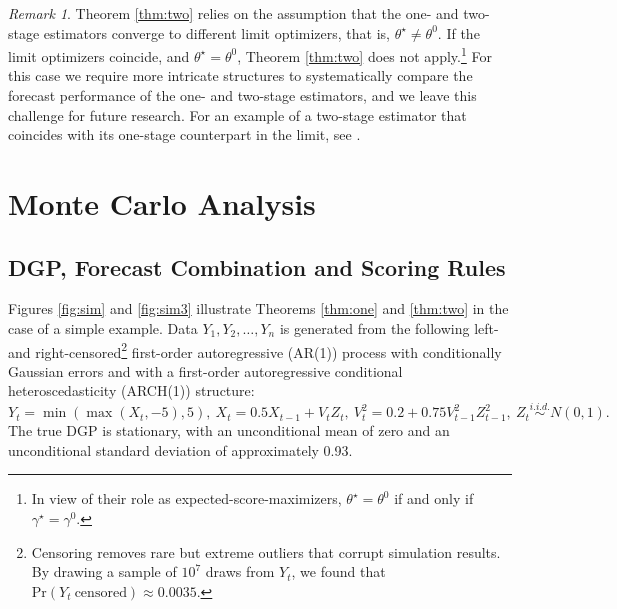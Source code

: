 \documentclass[12pt]{article}
\theoremstyle{definition}
\theoremstyle{remark}
\newtheorem{remark}{Remark}
\begin{document}
\begin{remark}
\label{rmk:derivassump} Theorem \ref{thm:two} relies on the assumption that the one- and two-stage estimators converge to different limit optimizers, that is, $\theta^{\star} \neq \theta^0$. If the limit optimizers coincide, and $\theta^{\star} = \theta^0$, Theorem \ref{thm:two} does not apply.\footnote{In view of their role as expected-score-maximizers, $\theta^{\star} = \theta^0$ if and only if $\gamma^{\star} = \gamma^0$.} For this case we require more intricate structures to systematically compare the forecast performance of the one- and two-stage estimators, and we leave this challenge for future research. For an example of a two-stage estimator that coincides with its one-stage counterpart in the limit, see \citet[sec. 2]{Pagan1986}.
\end{remark}

\section{Monte Carlo Analysis\label{sec:montecarlo}}

\subsection{DGP, Forecast Combination and Scoring Rules\label{subsec:montecarlodgp}}

Figures \ref{fig:sim} and \ref{fig:sim3} illustrate Theorems \ref{thm:one} and \ref{thm:two} in the case of a simple example. Data $Y_1, Y_2, \ldots, Y_n$ is generated from the following left- and right-censored\footnote{Censoring removes rare but extreme outliers that corrupt simulation results. By drawing a sample of $10^7$ draws from $Y_t$, we found that $\mathrm{Pr}(Y_t\ \mathrm{censored}) \approx 0.0035$.} first-order autoregressive (AR(1)) process with conditionally Gaussian errors and with a first-order autoregressive conditional heteroscedasticity (ARCH(1)) structure: 
\begin{equation*}
Y_t = \min(\max(X_t,-5),5),\ X_t = 0.5 X_{t-1} + V_t Z_t,\ V_t^2 = 0.2 + 0.75 V_{t-1}^2 Z_{t-1}^2,\ Z_t \overset{i.i.d.}{\sim} N(0,1).
\end{equation*}
The true DGP is stationary, with an unconditional mean of zero and an unconditional standard deviation of approximately 0.93.
\end{document}
